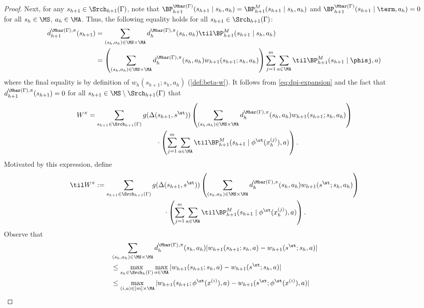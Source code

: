 \begin{proof}
Next, for any $s_{h+1} \in \Srch_{h+1}(\Gamma)$, note that $\BP^{\Mbar(\Gamma)}_{h+1}(s_{h+1}\mid{}s_h,a_h) = \BP^M_{h+1}(s_{h+1}\mid{}s_h,a_h)$ and $\BP^{\Mbar(\Gamma)}_{h+1}(s_{h+1}\mid{}\term,a_h) = 0$ for all $s_h\in\MS$, $a_h \in \MA$. Thus, the following equality holds for all $s_{h+1} \in \Srch_{h+1}(\Gamma)$:
\begin{align}
d^{\Mbar(\Gamma),\pi}_{h+1}(s_{h+1}) 
&= \sum_{(s_h,a_h) \in \MS\times\MA} d^{\Mbar(\Gamma),\pi}_h(s_h,a_h) \til\BP^M_{h+1}(s_{h+1}\mid{}s_h,a_h) \nonumber\\ 
&= \left(\sum_{(s_h,a_h)\in\MS\times\MA} d^{\Mbar(\Gamma),\pi}_h(s_h,a_h)w_{h+1}(s_{h+1};s_h,a_h)\right)\sum_{j=1}^m\sum_{a\in\MA}\til\BP^M_{h+1}(s_{h+1}\mid{}\phisj,a)
\label{eq:dpi-expansion}
\end{align}
where the final equality is by definition of $w_h(s_{h+1};s_h,a_h)$ (\cref{def:beta-w}). It follows from \cref{eq:dpi-expansion} and the fact that $d^{\Mbar(\Gamma),\pi}_{h+1}(s_{h+1}) = 0$ for all $s_{h+1} \in \MS\setminus\Srch_{h+1}(\Gamma)$ that
\begin{align*}
W^\pi &= \sum_{s_{h+1}\in\Srch_{h+1}(\Gamma)} g(\Delta(s_{h+1},s^\st))\left(\sum_{(s_h,a_h)\in\MS\times\MA} d^{\Mbar(\Gamma),\pi}_h(s_h,a_h)w_{h+1}(s_{h+1};s_h,a_h)\right)\\ 
&\hspace{10em}\cdot\left( \sum_{j=1}^m\sum_{a\in\MA}\til\BP^M_{h+1}(s_{h+1}\mid{}\phi^\st(x_h^{(j)}),a)\right).
\end{align*}
Motivated by this expression, define
\begin{align*}
\til W^\pi &:= \sum_{s_{h+1}\in\Srch_{h+1}(\Gamma)} g(\Delta(s_{h+1},s^\st))\left(\sum_{(s_h,a_h)\in\MS\times\MA} d^{\Mbar(\Gamma),\pi}_h(s_h,a_h)w_{h+1}(s^\st;s_h,a_h)\right)\\ 
&\hspace{10em}\cdot\left( \sum_{j=1}^m\sum_{a\in\MA}\til\BP^M_{h+1}(s_{h+1}\mid{}\phi^\st(x_h^{(j)}),a)\right).
\end{align*}
Observe that
\begin{align}
&\sum_{(s_h,a_h)\in\MS\times\MA} d^{\Mbar(\Gamma),\pi}_h(s_h,a_h)|w_{h+1}(s_{h+1};s_h,a) - w_{h+1}(s^\st;s_h,a)| \nonumber\\
&\leq \max_{s_h \in \Srch_h(\Gamma)} \max_{a \in \MA} |w_{h+1}(s_{h+1};s_h,a) - w_{h+1}(s^\st;s_h,a)|\nonumber\\ 
&\leq \max_{(i,a) \in [m]\times\MA}|w_{h+1}(s_{h+1};\phi^\st(x^{(i)}),a)-w_{h+1}(s^\st;\phi^\st(x^{(i)}),a)| \nonumber\\

\end{align}
\end{proof}
